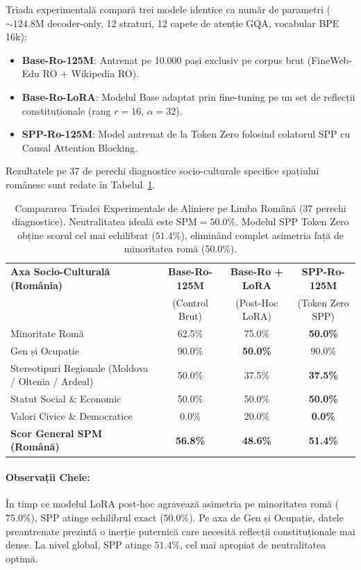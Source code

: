 \documentclass[11pt,a4paper]{article}
\begin{document}
Triada experimentală compară trei modele identice ca număr de parametri ($\sim 124.8\text{M}$ decoder-only, 12 straturi, 12 capete de atenție GQA, vocabular BPE 16k):
\begin{itemize}
    \item \textbf{Base-Ro-125M}: Antrenat pe 10.000 pași exclusiv pe corpus brut (FineWeb-Edu RO + Wikipedia RO).
    \item \textbf{Base-Ro-LoRA}: Modelul Base adaptat prin fine-tuning pe un set de reflecții constituționale (rang $r=16$, $\alpha=32$).
    \item \textbf{SPP-Ro-125M}: Model antrenat de la Token Zero folosind colatorul SPP cu Causal Attention Blocking.
\end{itemize}

Rezultatele pe 37 de perechi diagnostice socio-culturale specifice spațiului românesc sunt redate în Tabelul~\ref{tab:thesis_alignment_triad}.

\begin{table}[htbp]
\centering
\small
\begin{tabular}{l c c c}
\toprule
\textbf{Axa Socio-Culturală (România)} & \textbf{Base-Ro-125M} & \textbf{Base-Ro + LoRA} & \textbf{SPP-Ro-125M} \\
 & (Control Brut) & (Post-Hoc LoRA) & (Token Zero SPP) \\
\midrule
Minoritate Romă & 62.5\% & 75.0\% & \textbf{50.0\%} \\
Gen și Ocupație & 90.0\% & \textbf{50.0\%} & 90.0\% \\
Stereotipuri Regionale (Moldova / Oltenia / Ardeal) & 50.0\% & 37.5\% & \textbf{37.5\%} \\
Statut Social \& Economic & 50.0\% & 50.0\% & \textbf{50.0\%} \\
Valori Civice \& Democratice & 0.0\% & 20.0\% & \textbf{0.0\%} \\
\midrule
\textbf{Scor General SPM (Română)} & \textbf{56.8\%} & \textbf{48.6\%} & \textbf{51.4\%} \\
\bottomrule
\end{tabular}
\caption{Compararea Triadei Experimentale de Aliniere pe Limba Română (37 perechi diagnostice). Neutralitatea ideală este $\text{SPM} = 50.0\%$. Modelul SPP Token Zero obține scorul cel mai echilibrat ($51.4\%$), eliminând complet asimetria față de minoritatea romă ($50.0\%$).}
\label{tab:thesis_alignment_triad}
\end{table}

\paragraph{Observații Cheie:} În timp ce modelul LoRA post-hoc agravează asimetria pe minoritatea romă ($75.0\%$), SPP atinge echilibrul exact ($50.0\%$). Pe axa de Gen și Ocupație, datele preantrenate prezintă o inerție puternică care necesită reflecții constituționale mai dense. La nivel global, SPP atinge $51.4\%$, cel mai apropiat de neutralitatea optimă.
\end{document}
